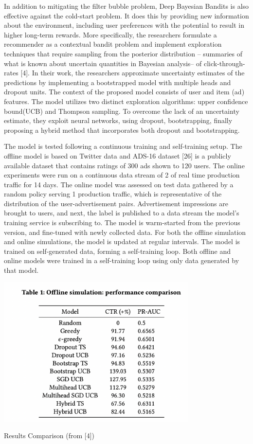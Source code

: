 In addition to mitigating the filter bubble problem, Deep Bayesian Bandits is also effective against the cold-start problem. It does this by providing new information about the environment, including user preferences with the potential to result in  higher long-term rewards. More specifically, the researchers formulate a recommender as a contextual bandit problem and implement exploration techniques that require sampling from the posterior distribution -- summaries of what is known about uncertain quantities in Bayesian analysis-- of click-through-rates [4]. In their work, the researchers approximate uncertainty estimates of the predictions by implementing a bootstrapped model with multiple heads and dropout units. The context of the proposed model consists of user and item (ad) features. The model utilizes two distinct exploration algorithms: upper confidence bound(UCB) and Thompson sampling. To overcome the lack of an uncertainty estimate, they exploit neural networks, using dropout, bootstrapping, finally proposing a hybrid method that incorporates both dropout and bootstrapping. 

The model is tested following a continuous training and self-training setup. The offline model is based on Twitter data and ADS-16 dataset [26] is a publicly available dataset
that contains ratings of 300 ads shown to 120 users. The online experiments were run on a continuous data stream of 2\text{\%} of real time production traffic for 14 days. The online model was assessed on test data gathered by a random policy serving 1\text{\%} production traffic, which is representative of the distribution of the user-advertisement pairs.  Advertisement impressions are brought to users, and next, the label is published to a data stream the model’s training service is subscribing to. The model is warm-started from the previous version, and fine-tuned with newly collected data. For both the offline simulation and online simulations, the model is updated at regular intervals. The model is trained on self-generated data, forming a self-training loop. Both offline and online models were trained in a self-training loop using only data generated by that model. 

\begin{table}[hh!]
    \centering
    \includegraphics[width=100mm]{bandits_results.png}
    \caption{Results Comparison (from [4])
    \label{overflow}}
\end{table}

